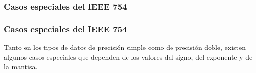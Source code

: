 \begin{frame}
\subsubsection{Casos especiales del IEEE 754}
\frametitle{Casos especiales del IEEE 754}
Tanto en los tipos de datos de precisión simple como de precisión doble, existen algunos casos especiales que dependen de los valores del signo, del exponente y de la mantisa.
\end{frame}
